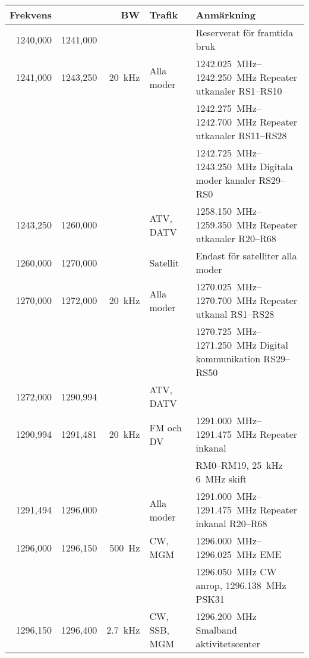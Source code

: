 \begin{tabular}{rrrll}
	\textbf{Frekvens} &          & \textbf{BW} & \textbf{Trafik} & \textbf{Anmärkning}          \\ \hline

1240,000 & 1241,000 &         &            & Reserverat för framtida bruk \\ \hline
1241,000 & 1243,250 & \qty{20}{\kilo\hertz} & Alla moder & \SIrange{1242,025}{1242,250}{\mega\hertz} Repeater utkanaler RS1--RS10 \\
	     &          &         &            & \SIrange{1242,275}{1242,700}{\mega\hertz} Repeater utkanaler RS11--RS28\\
	     &          &         &            & \SIrange{1242,725}{1243,250}{\mega\hertz} Digitala moder kanaler RS29--RS0\\ \hline
1243,250 & 1260,000 &         & ATV, DATV  & \SIrange{1258,150}{1259,350}{\mega\hertz} Repeater utkanaler R20--R68\\ \hline
1260,000 & 1270,000 &         & Satellit     & Endast för satelliter alla moder                              \\ \hline
1270,000 & 1272,000 & \qty{20}{\kilo\hertz} & Alla moder   & \SIrange{1270,025}{1270,700}{\mega\hertz} Repeater utkanal  RS1--RS28  \\
	 &          &         &              & \SIrange{1270,725}{1271,250}{\mega\hertz} Digital kommunikation RS29--RS50\\ \hline
1272,000 & 1290,994 &         & ATV, DATV  &                                         \\ \hline
1290,994 & 1291,481 & \qty{20}{\kilo\hertz}  & FM och DV    & \SIrange{1291,000}{1291,475}{\mega\hertz} Repeater inkanal \\
	 &          &         &              & RM0--RM19, \qty{25}{\kilo\hertz} \qty{6}{\mega\hertz} skift    \\ \hline
1291,494 & 1296,000 &     & Alla moder   & \SIrange{1291,000}{1291,475}{\mega\hertz} Repeater inkanal R20--R68 \\ \hline
1296,000 & 1296,150 & \qty{500}{\hertz}  & CW, MGM     & \SIrange{1296,000}{1296,025}{\mega\hertz} EME \\
	 &          &         &              & \qty{1296,050}{\mega\hertz} CW anrop, \qty{1296,138}{\mega\hertz} PSK31 \\ \hline
1296,150 & 1296,400 & \qty{2,7}{\kilo\hertz} & CW, SSB, MGM & \qty{1296,200}{\mega\hertz} Smalband aktivitetscenter \\ \hline

\end{tabular}
